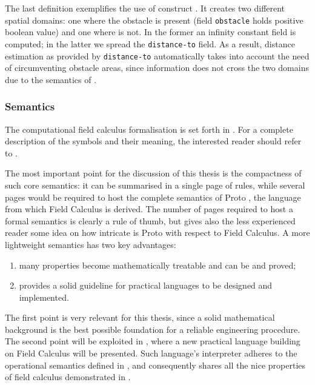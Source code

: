 \documentclass[12pt,a4paper,twoside,openright]{book}
\begin{document}
The last definition exemplifies the use of construct \texttt{\ifN}. It creates two different spatial domains: one where the obstacle is present (field {\tt obstacle} holds positive boolean value) and one where is not. In the former an infinity constant field is computed; in the latter we spread the {\tt distance-to} field.
%
As a result, distance estimation as provided by {\tt distance-to} automatically takes into account the need of circumventing obstacle areas, since information does not cross the two domains due to the semantics of \texttt{\nbrN}.

\subsubsection{Semantics}

The computational field calculus formalisation is set forth in .
%
For a complete description of the symbols and their meaning, the interested reader should refer to \cite{VDB-FOCLASA-CIC2013}.

The most important point for the discussion of this thesis is the compactness of such core semantics: it can be summarised in a single page of rules, while several pages would be required to host the complete semantics of Proto \cite{spatialcomputing-sac11,spatialcomputing-scp78}, the language from which Field Calculus is derived.
%
The number of pages required to host a formal semantics is clearly a rule of thumb, but gives also the less experienced reader some idea on how intricate is Proto with respect to Field Calculus.
%
A more lightweight semantics has two key advantages:
\begin{enumerate}
 \item many properties become mathematically treatable and can be and proved;
 \item provides a solid guideline for practical languages to be designed and implemented.
\end{enumerate}
%
The first point is very relevant for this thesis, since a solid mathematical background is the best possible foundation for a reliable engineering procedure.
%
The second point will be exploited in , where a new practical language building on Field Calculus will be presented.
%
Such language's interpreter adheres to the operational semantics defined in , and consequently shares all the nice properties of field calculus demonstrated in \cite{VDB-FOCLASA-CIC2013}.

%
\end{document}
